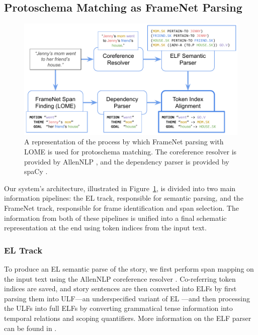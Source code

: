 \subsection{Protoschema Matching as FrameNet Parsing}
\label{sec:lome}

\begin{figure}
    \centering
    \includegraphics[width=\columnwidth]{figures/nesl/lome_architecture}
    \caption{A representation of the process by which FrameNet parsing with LOME is used for protoschema matching. The coreference resolver is provided by AllenNLP \citep{Gardner2017AllenNLP}, and the dependency parser is provided by spaCy \citep{spacy2}.}
    \label{fig:lome_architecture}
\end{figure}

Our system's architecture, illustrated in Figure~\ref{fig:lome_architecture}, is divided into two main information pipelines: the EL track, responsible for semantic parsing, and the FrameNet track, responsible for frame identification and span selection. The information from both of these pipelines is unified into a final schematic representation at the end using token indices from the input text.

\subsubsection{EL Track}
To produce an EL semantic parse of the story, we first perform span mapping on the input text using the AllenNLP coreference resolver \citep{Gardner2017AllenNLP}. Co-referring token indices are saved, and story sentences are then converted into ELFs by first parsing them into ULF---an underspecified variant of EL \citep{kim2019IWCS}---and then processing the ULFs into full ELFs by converting grammatical tense information into temporal relations and scoping quantifiers. More information on the ELF parser can be found in \citep{Lawley2021LearningGE}.

